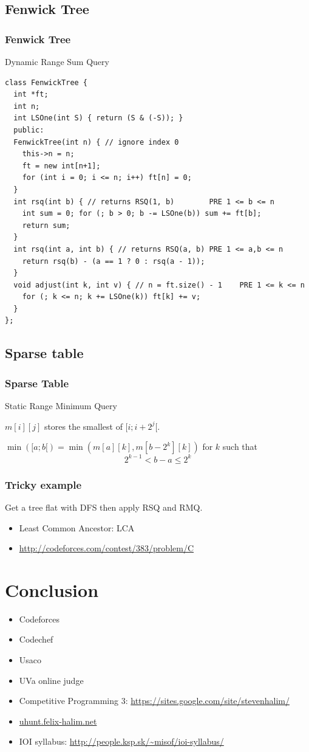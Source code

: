 \documentclass[10pt,svgnames,usenames,table]{beamer} %
\begin{document}
\subsection{Fenwick Tree}
\begin{frame}
  \frametitle{Fenwick Tree}
  Dynamic Range Sum Query
  \framebreak
  \begin{lstlisting}
class FenwickTree {
  int *ft;
  int n;
  int LSOne(int S) { return (S & (-S)); }
  public:
  FenwickTree(int n) { // ignore index 0
    this->n = n;
    ft = new int[n+1];
    for (int i = 0; i <= n; i++) ft[n] = 0;
  }
  int rsq(int b) { // returns RSQ(1, b)        PRE 1 <= b <= n
    int sum = 0; for (; b > 0; b -= LSOne(b)) sum += ft[b];
    return sum;
  }
  int rsq(int a, int b) { // returns RSQ(a, b) PRE 1 <= a,b <= n
    return rsq(b) - (a == 1 ? 0 : rsq(a - 1));
  }
  void adjust(int k, int v) { // n = ft.size() - 1    PRE 1 <= k <= n
    for (; k <= n; k += LSOne(k)) ft[k] += v;
  }
};
  \end{lstlisting}
\end{frame}

\subsection{Sparse table}
\begin{frame}
  \frametitle{Sparse Table}
  Static Range Minimum Query

  $m[i][j]$ stores the smallest of $[i;i+2^j[$.

  $\min([a; b[) = \min(m[a][k], m[b-2^k][k])$ for $k$ such that
  $$2^{k-1} < b-a \leq 2^k$$
\end{frame}

\begin{frame}
  \frametitle{Tricky example}
  Get a tree flat with DFS then apply RSQ and RMQ.
  \begin{itemize}
    \item Least Common Ancestor: LCA
    \item \url{http://codeforces.com/contest/383/problem/C}
  \end{itemize}
\end{frame}

\section{Conclusion}

\begin{frame}
  \begin{itemize}
    \item Codeforces
    \item Codechef
    \item Usaco
    \item UVa online judge
    \item Competitive Programming 3: \url{https://sites.google.com/site/stevenhalim/}
    \item \url{uhunt.felix-halim.net}
    \item IOI syllabus: \url{http://people.ksp.sk/~misof/ioi-syllabus/}
  \end{itemize}
\end{frame}
\end{document}
